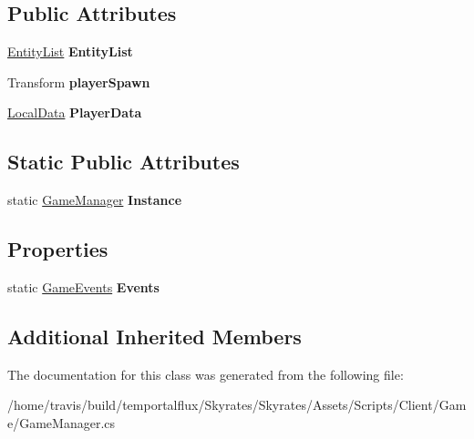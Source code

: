 \subsection*{Public Attributes}
\begin{DoxyCompactItemize}
\item 
\hypertarget{class_skyrates_1_1_client_1_1_game_1_1_game_manager_a6cd625a0d48f736b04afc3ec98e4ed53}{\hyperlink{class_skyrates_1_1_common_1_1_entity_1_1_entity_list}{Entity\-List} {\bfseries Entity\-List}}\label{class_skyrates_1_1_client_1_1_game_1_1_game_manager_a6cd625a0d48f736b04afc3ec98e4ed53}

\item 
\hypertarget{class_skyrates_1_1_client_1_1_game_1_1_game_manager_a39846b49f8069b0d99ce5622aac06ac8}{Transform {\bfseries player\-Spawn}}\label{class_skyrates_1_1_client_1_1_game_1_1_game_manager_a39846b49f8069b0d99ce5622aac06ac8}

\item 
\hypertarget{class_skyrates_1_1_client_1_1_game_1_1_game_manager_a370a843db6f1bc3d9a3e9a500aad0775}{\hyperlink{class_skyrates_1_1_client_1_1_data_1_1_local_data}{Local\-Data} {\bfseries Player\-Data}}\label{class_skyrates_1_1_client_1_1_game_1_1_game_manager_a370a843db6f1bc3d9a3e9a500aad0775}

\end{DoxyCompactItemize}
\subsection*{Static Public Attributes}
\begin{DoxyCompactItemize}
\item 
\hypertarget{class_skyrates_1_1_client_1_1_game_1_1_game_manager_accacf771756ee6a41d2c0ced6bf798ca}{static \hyperlink{class_skyrates_1_1_client_1_1_game_1_1_game_manager}{Game\-Manager} {\bfseries Instance}}\label{class_skyrates_1_1_client_1_1_game_1_1_game_manager_accacf771756ee6a41d2c0ced6bf798ca}

\end{DoxyCompactItemize}
\subsection*{Properties}
\begin{DoxyCompactItemize}
\item 
\hypertarget{class_skyrates_1_1_client_1_1_game_1_1_game_manager_a0fe4743cbadedfc0ad93d51534f3d339}{static \hyperlink{class_skyrates_1_1_client_1_1_game_1_1_event_1_1_game_events}{Game\-Events} {\bfseries Events}}\label{class_skyrates_1_1_client_1_1_game_1_1_game_manager_a0fe4743cbadedfc0ad93d51534f3d339}

\end{DoxyCompactItemize}
\subsection*{Additional Inherited Members}


The documentation for this class was generated from the following file\-:\begin{DoxyCompactItemize}
\item 
/home/travis/build/temportalflux/\-Skyrates/\-Skyrates/\-Assets/\-Scripts/\-Client/\-Game/Game\-Manager.\-cs\end{DoxyCompactItemize}
